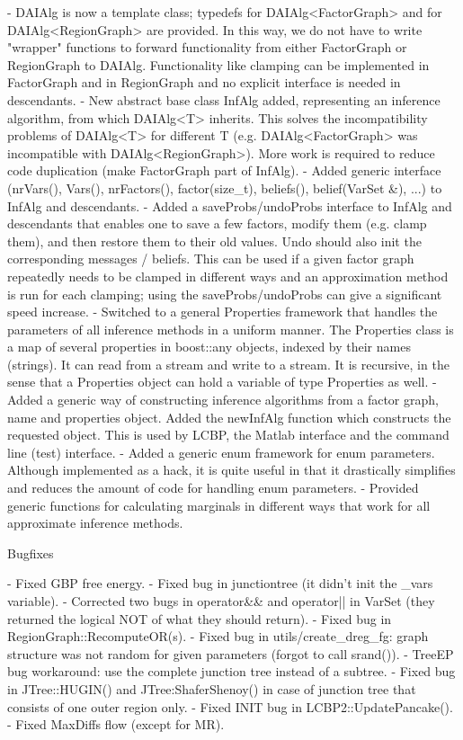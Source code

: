 \begin{DoxyVerbInclude}
- DAIAlg is now a template class; typedefs for DAIAlg<FactorGraph> and for
  DAIAlg<RegionGraph> are provided. In this way, we do not have to write "wrapper"
  functions to forward functionality from either FactorGraph or RegionGraph
  to DAIAlg. Functionality like clamping can be implemented in FactorGraph
  and in RegionGraph and no explicit interface is needed in descendants.
- New abstract base class InfAlg added, representing an inference algorithm,
  from which DAIAlg<T> inherits. This solves the incompatibility problems of
  DAIAlg<T> for different T (e.g. DAIAlg<FactorGraph> was incompatible with
  DAIAlg<RegionGraph>). More work is required to reduce code duplication
  (make FactorGraph part of InfAlg).
- Added generic interface (nrVars(), Vars(), nrFactors(), factor(size_t),
  beliefs(), belief(VarSet &), ...) to InfAlg and descendants.
- Added a saveProbs/undoProbs interface to InfAlg and descendants that enables
  one to save a few factors, modify them (e.g. clamp them), and then restore them
  to their old values. Undo should also init the corresponding messages / beliefs.
  This can be used if a given factor graph repeatedly needs to be clamped in
  different ways and an approximation method is run for each clamping; using the
  saveProbs/undoProbs can give a significant speed increase.
- Switched to a general Properties framework that handles the parameters of
  all inference methods in a uniform manner. The Properties class is a map of
  several properties in boost::any objects, indexed by their names (strings).
  It can read from a stream and write to a stream. It is recursive, in the sense
  that a Properties object can hold a variable of type Properties as well.
- Added a generic way of constructing inference algorithms from a factor graph,
  name and properties object. Added the newInfAlg function which constructs
  the requested object. This is used by LCBP, the Matlab interface and the
  command line (test) interface.
- Added a generic enum framework for enum parameters. Although implemented as a
  hack, it is quite useful in that it drastically simplifies and reduces the
  amount of code for handling enum parameters.
- Provided generic functions for calculating marginals in different ways that
  work for all approximate inference methods.

Bugfixes

- Fixed GBP free energy.
- Fixed bug in junctiontree (it didn't init the _vars variable).
- Corrected two bugs in operator&& and operator|| in VarSet (they returned
  the logical NOT of what they should return).
- Fixed bug in RegionGraph::RecomputeOR(s).
- Fixed bug in utils/create_dreg_fg:
  graph structure was not random for given parameters (forgot to call srand()).
- TreeEP bug workaround: use the complete junction tree instead of a subtree.
- Fixed bug in JTree::HUGIN() and JTree:ShaferShenoy() in case of junction tree
  that consists of one outer region only.
- Fixed INIT bug in LCBP2::UpdatePancake().
- Fixed MaxDiffs flow (except for MR).


\end{DoxyVerbInclude}

